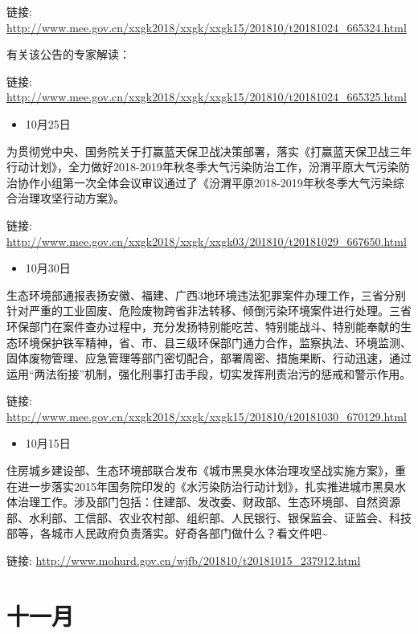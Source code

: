 \documentclass[]{book}
\providecommand{\tightlist}{%
  \setlength{\itemsep}{0pt}\setlength{\parskip}{0pt}}
\begin{document}
链接: \url{http://www.mee.gov.cn/xxgk2018/xxgk/xxgk15/201810/t20181024_665324.html}

有关该公告的专家解读：

链接: \url{http://www.mee.gov.cn/xxgk2018/xxgk/xxgk15/201810/t20181024_665325.html}

\begin{itemize}
\tightlist
\item
  10月25日
\end{itemize}

为贯彻党中央、国务院关于打赢蓝天保卫战决策部署，落实《打赢蓝天保卫战三年行动计划》，全力做好2018-2019年秋冬季大气污染防治工作，汾渭平原大气污染防治协作小组第一次全体会议审议通过了《汾渭平原2018-2019年秋冬季大气污染综合治理攻坚行动方案》。

链接: \url{http://www.mee.gov.cn/xxgk2018/xxgk/xxgk03/201810/t20181029_667650.html}

\begin{itemize}
\tightlist
\item
  10月30日
\end{itemize}

生态环境部通报表扬安徽、福建、广西3地环境违法犯罪案件办理工作，三省分别针对严重的工业固废、危险废物跨省非法转移、倾倒污染环境案件进行处理。三省环保部门在案件查办过程中，充分发扬特别能吃苦、特别能战斗、特别能奉献的生态环境保护铁军精神，省、市、县三级环保部门通力合作，监察执法、环境监测、固体废物管理、应急管理等部门密切配合，部署周密、措施果断、行动迅速，通过运用``两法衔接''机制，强化刑事打击手段，切实发挥刑责治污的惩戒和警示作用。

链接: \url{http://www.mee.gov.cn/xxgk2018/xxgk/xxgk15/201810/t20181030_670129.html}

\begin{itemize}
\tightlist
\item
  10月15日
\end{itemize}

住房城乡建设部、生态环境部联合发布《城市黑臭水体治理攻坚战实施方案》，重在进一步落实2015年国务院印发的《水污染防治行动计划》，扎实推进城市黑臭水体治理工作。涉及部门包括：住建部、发改委、财政部、生态环境部、自然资源部、水利部、工信部、农业农村部、组织部、人民银行、银保监会、证监会、科技部等，各城市人民政府负责落实。好奇各部门做什么？看文件吧\textasciitilde{}

链接: \url{http://www.mohurd.gov.cn/wjfb/201810/t20181015_237912.html}

\hypertarget{ux5341ux4e00ux6708-1}{%
\section*{十一月}\label{ux5341ux4e00ux6708-1}}
\end{document}

